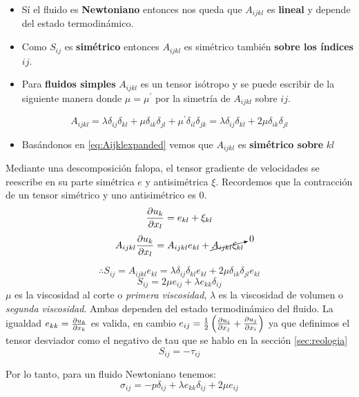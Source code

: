 \begin{itemize}
\item Sí el fluido es \textbf{Newtoniano} entonces nos queda que $A_{ijkl}$ es \textbf{lineal} y depende del estado termodinámico.

\item Como $S_{ij}$ es \textbf{simétrico} entonces $A_{ijkl}$ es simétrico también \textbf{sobre los índices }$ij$. 

\item Para \textbf{fluidos simples} $A_{ijkl}$ es un tensor isótropo y se puede escribir de la siguiente manera donde $\mu=\mu^\prime$ por la simetría de $A_{ijkl}$ sobre $ij$.
\end{itemize}
\begin{equation} \label{eq:Aijklexpanded}
    A_{ijkl}=\lambda\delta_{ij}\delta_{kl} +\mu\delta_{ik}\delta_{jl}+\mu^\prime \delta_{il}\delta_{jk}=\lambda\delta_{ij}\delta_{kl} +2\mu\delta_{ik}\delta_{jl}
\end{equation}

\begin{itemize}
\item Basándonos en \ref{eq:Aijklexpanded} vemos que $A_{ijkl}$ es \textbf{simétrico sobre} $kl$
\end{itemize}
Mediante una descomposición falopa, el tensor gradiente de velocidades se reescribe en su parte simétrica $e$ y antisimétrica $\xi$. Recordemos que la contracción de un tensor simétrico y uno antisimétrico es $0$.
$$\frac{\partial u_k}{\partial x_l}=e_{kl}+\xi_{kl}$$
$$A_{ijkl}\frac{\partial u_k}{\partial x_l}=A_{ijkl}e_{kl}+\cancelto{0}{A_{ijkl}\xi_{kl}} $$

$$\therefore S_{ij}= A_{ijkl}e_{kl}=\lambda\delta_{ij}\delta_{kl}e_{kl} +2\mu\delta_{ik}\delta_{jl}e_{kl}$$
\begin{equation}
    S_{ij}=2\mu e_{ij}+\lambda e_{kk} \delta_{ij}
\end{equation}
$\mu$ es la viscosidad al corte o \emph{primera viscosidad}, $\lambda$ es la viscosidad de volumen o \emph{segunda viscosidad}. Ambas dependen del estado termodinámico del fluido. La igualdad $e_{kk}=\frac{\partial u_k}{\partial x_k}$ es valida, en cambio $e_{ij}=\frac{1}{2}\left(\frac{\partial u_i}{\partial x_j}+\frac{\partial u_j}{\partial x_i}\right)$ ya que definimos el tensor desviador como el negativo de tau que se hablo en la sección \ref{sec:reologia}
\[
S_{ij}=-\tau_{ij}
\]

Por lo tanto, para un fluido Newtoniano tenemos:
\begin{equation}\label{eq:sigmanewt}
\sigma_{ij}=-p\delta_{ij}+\lambda e_{kk}\delta_{ij}+2\mu e_{ij} 
\end{equation}


